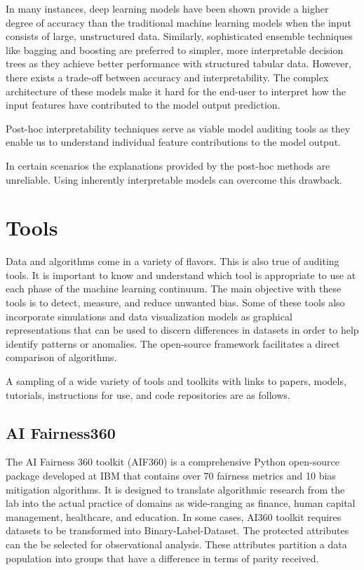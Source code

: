 \documentclass[conference]{IEEEtran}
\begin{document}
In many instances, deep learning models have been shown provide a higher degree of accuracy than the traditional machine learning models when the input consists of large, unstructured data. Similarly, sophisticated ensemble techniques like bagging and boosting are preferred to simpler, more interpretable decision trees as they achieve better performance with structured tabular data. However, there exists a trade-off between accuracy and interpretability. The complex architecture of these models make it hard for the end-user to interpret how the input features have contributed to the model output prediction.

Post-hoc interpretability techniques serve as viable model auditing tools as they enable us to understand individual feature contributions to the model output.

In certain scenarios the explanations provided by the post-hoc methods are unreliable. Using inherently interpretable models can overcome this drawback.

\section{Tools}
Data and algorithms come in a variety of flavors. This is also true of auditing tools. It is important to know and understand which tool is appropriate to use at each phase of the machine learning continuum.
The main objective with these tools is to detect, measure, and reduce unwanted bias.
Some of these tools also incorporate simulations and data visualization models as graphical representations that can be used to discern differences in datasets in order to help identify patterns or anomalies.
The open-source framework facilitates a direct comparison of algorithms.

A sampling of a wide variety of tools and toolkits with links to papers, models, tutorials, instructions for use, and code repositories are as follows.

\subsection{AI Fairness360}

The AI Fairness 360 toolkit (AIF360) is a comprehensive Python open-source package developed at IBM that contains over 70 fairness metrics and 10 bias mitigation algorithms. \cite{b15} It is designed to translate algorithmic research from the lab into the actual practice of domains as wide-ranging as finance, human capital management, healthcare, and education. \cite{b16} In some cases, AI360 toolkit requires datasets to be transformed into Binary-Label-Dataset. The protected attributes can the be selected for observational analysis. These attributes partition a data population into groups that have a difference in terms of parity received.
\end{document}
